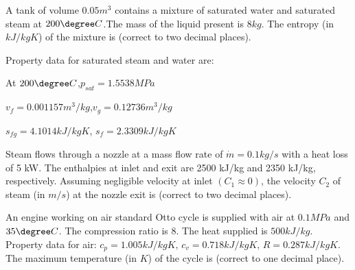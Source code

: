     \item A tank of volume $0.05 m^3$ contains a mixture of saturated water and saturated steam at $200\degree C$.The mass of the liquid present is $8 kg$. The entropy (in $kJ/kg K$) of the mixture is \underline{\hspace{1cm}} (correct to two decimal places).

        Property data for saturated steam and water are:

        At $200\degree C$,$p_{sat}= 1.5538 MPa$

        $v_{f} = 0.001157 m^3/kg$,$v_{g} = 0.12736 m^3/kg$

        $s_{fg} = 4.1014 kJ/kg K$, $s_{f} = 2.3309 kJ/kg K$
    
    \item Steam flows through a nozzle at a mass flow rate of $\dot{m}=0.1kg/s$ with a heat loss of 5 kW. The enthalpies at inlet and exit are 2500 kJ/kg and 2350 kJ/kg, respectively. Assuming
        negligible velocity at inlet $(C_1\approx0)$, the velocity $C_2$ of steam (in $m/s$) at the nozzle exit is \underline{\hspace{1cm}} (correct to two decimal places).
        \begin{figure}[!ht]
            \centering
        \end{figure}

    \item An engine working on air standard Otto cycle is supplied with air at $0.1 MPa$ and $35\degree C$. The compression ratio is $8$. The heat supplied is $500 kJ/kg$. Property data for air: $c_p = 1.005 kJ/kg K,\,c_v = 0.718 kJ/kg K,\,R = 0.287 kJ/kg K$. The maximum temperature (in $K$) of the cycle is \underline{\hspace{1cm}} (correct to one decimal place).

